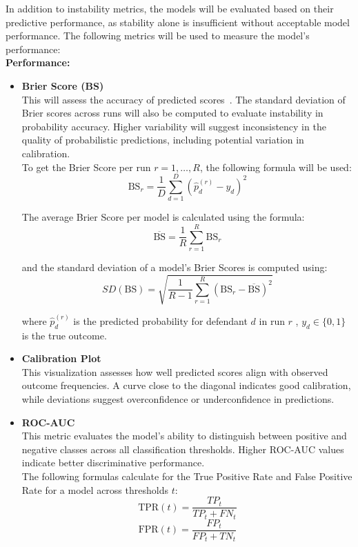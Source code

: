 \documentclass[12pt]{article}
\begin{document}
In addition to instability metrics, the models will be evaluated based on their predictive performance, as stability alone is insufficient without acceptable model performance. The following metrics will be used to measure the model's performance: \\

\textbf{Performance:} 
\begin{itemize}
  \item \textbf{Brier Score (BS)}\\
    \tab This will assess the accuracy of predicted scores~\cite{rufibach2010use}. The standard deviation of Brier scores across runs will also be computed to evaluate instability in probability accuracy. Higher variability will suggest inconsistency in the quality of probabilistic predictions, including potential variation in calibration.\\

    To get the Brier Score per run $ r=1, \dots, R $, the following formula will be used:
    \[ \text{BS}_r = \frac{1}{D} \sum_{d=1}^{D} \left( \hat{p}_d^{(r)} - y_d \right)^2 \]

    The average Brier Score per model is calculated using the formula:
    \[ \overline{\text{BS}}=\frac{1}{R}\sum_{r=1}^{R}\text{BS}_r \]

    and the standard deviation of a model's Brier Scores is computed using:
    \[ SD(\text{BS}) = \sqrt{ \frac{1}{R - 1} \sum_{r=1}^{R} \left( \text{BS}_r - \overline{\text{BS}} \right)^2 } \]

    where $ \hat{p}_d^{(r)} $ is the predicted probability for defendant $ d $ in run $ r $ , $ y_d \in \{0,1\} $ is the true outcome.

  \item \textbf{Calibration Plot}\\
  \tab This visualization assesses how well predicted scores align with observed outcome frequencies. A curve close to the diagonal indicates good calibration, while deviations suggest overconfidence or underconfidence in predictions.
  
  \item \textbf{ROC-AUC}\\
  \tab This metric evaluates the model's ability to distinguish between positive and negative classes across all classification thresholds. Higher ROC-AUC values indicate better discriminative performance.\\

  The following formulas calculate for the True Positive Rate and False Positive Rate for a model across thresholds $ t $:
  \[ \text{TPR}(t) = \frac{TP_t}{TP_t + FN_t} \]
  \[ \text{FPR}(t) = \frac{FP_t}{FP_t + TN_t} \]


\end{itemize}
\end{document}
